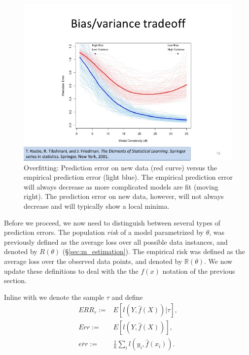 \documentclass[12pt,a4paper]{article}
\theoremstyle{plain}
\theoremstyle{definition}
\newcommand{\expect}[1]{E[#1]}
\newcommand{\loss}{l}
\newcommand{\risk}{R}
\newcommand{\riskn}{\mathbb{R}}
\newcommand{\hyp}{f}
\newcommand{\sample}{\tau}
\newcommand{\test}{ERR_\sample}
\newcommand{\train}{\overline{err}}
\begin{document}
\begin{figure}[h]
        \centering
        \includegraphics[width=1\textwidth]{art/support-vector-machine-15-728}
        \caption{Overfitting: 
        Prediction error on new data (red curve) versus the empirical prediction error (light blue).
        The empirical prediction error will always decrease as more complicated models are fit (moving right).
        The prediction error on new data, however, will not always decrease and will typically show a local minima.
        \label{fig:bias_variance}}
\end{figure}

Before we proceed, we now need to distinguish between several types of prediction errors.
The population \emph{risk} of a model parametrized by $\theta$, was previously defined as the average loss over all possible data instances, and denoted by $\risk(\theta)$ (\S \ref{sec:m_estimation}).
The empirical risk was defined as the average loss over the observed data points, and denoted by $\riskn(\theta)$.
We now update these definitions to deal with the the $\hyp(x)$ notation of the previous section.

Inline with \cite[Section 7]{hastie_elements_2003} we denote the sample $\sample$ and define
\begin{align}
	\test :=& \expect{\loss(Y,\hat{\hyp}(X))|\sample}, \label{eq:test_error} \\
	Err :=& \expect{\loss(Y,\hat{\hyp}(X))}, \label{eq:expected_test_error} \\
	\train :=& \frac{1}{n} \sum_i \loss(y_i,\hat{\hyp}(x_i)). \label{eq:training_error}
\end{align}
\end{document}
